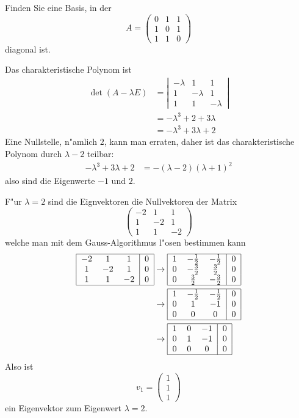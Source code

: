 Finden Sie eine Basis, in der
\[
A=\begin{pmatrix}
0&1&1\\
1&0&1\\
1&1&0
\end{pmatrix}
\]
diagonal ist.

\begin{loesung}
Das charakteristische Polynom ist
\begin{align*}
\det(A-\lambda E)
&=
\left|\,
\begin{matrix}
-\lambda&1&1\\
1&-\lambda&1\\
1&1&-\lambda
\end{matrix}
\,\right|
\\
&=-\lambda^3+2+3\lambda
\\
&=-\lambda^3+3\lambda+2
\end{align*}
Eine Nullstelle, n"amlich $2$, kann man erraten, daher ist das
charakteristische Polynom durch $\lambda-2$ teilbar:
\begin{align*}
-\lambda^3+3\lambda+2
&=-(\lambda-2)(\lambda+1)^2
\end{align*}
also sind die Eigenwerte $-1$ und $2$.

F"ur $\lambda=2$ sind die Eignvektoren die Nullvektoren der Matrix
\[
\begin{pmatrix}
-2&1&1\\
1&-2&1\\
1&1&-2
\end{pmatrix}
\]
welche man mit dem Gauss-Algorithmus l"osen bestimmen kann
\begin{align*}
\begin{tabular}{|ccc|c|}
\hline
$-2$&1&1&0\\
1&$-2$&1&0\\
1&1&$-2$&0\\
\hline
\end{tabular}
&\rightarrow
\begin{tabular}{|ccc|c|}
\hline
1&$-\frac12$&$-\frac12$&0\\
0&$-\frac32$&$\frac32$&0\\
0&$\frac32$&$-\frac32$&0\\
\hline
\end{tabular}
\\
&\rightarrow
\begin{tabular}{|ccc|c|}
\hline
1&$-\frac12$&$-\frac12$&0\\
0&1&$-1$&0\\
0&0&0&0\\
\hline
\end{tabular}
\\
&\rightarrow
\begin{tabular}{|ccc|c|}
\hline
1&0&$-1$&0\\
0&1&$-1$&0\\
0&0&0&0\\
\hline
\end{tabular}
\end{align*}
Also ist
\[
v_1=\begin{pmatrix}1\\1\\1\end{pmatrix}
\]
ein Eigenvektor zum Eigenwert $\lambda=2$.


\end{loesung}
